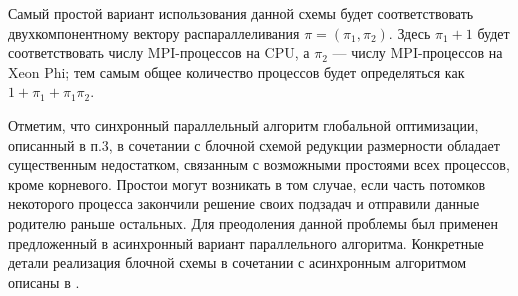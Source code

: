 \par
Самый простой вариант использования данной схемы будет соответствовать двухкомпонентному вектору распараллеливания \(\pi=(\pi_1,\pi_2)\). Здесь \(\pi_1+1\) будет соответствовать числу MPI-процессов на CPU, а \(\pi_2\) --- числу MPI-процессов на Xeon Phi; тем самым общее количество процессов будет определяться как \(1+\pi_1+\pi_1\pi_2\).
\par
Отметим, что синхронный параллельный алгоритм глобальной оптимизации, описанный в п.3, в сочетании с блочной схемой редукции размерности обладает существенным недостатком, связанным с возможными простоями всех процессов, кроме корневого. Простои могут возникать в том случае, если часть потомков некоторого процесса закончили решение своих подзадач и отправили данные родителю раньше остальных. Для преодоления данной проблемы был применен предложенный в \cite{examinArtcle} асинхронный вариант параллельного алгоритма. Конкретные детали реализация блочной схемы в сочетании с асинхронным алгоритмом описаны в \cite{examinArtcle}.
